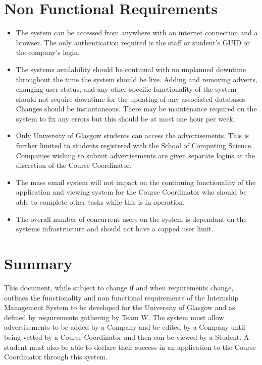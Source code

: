\documentclass{l3deliverable}
\begin{document}
\section{Non Functional Requirements}
\begin{itemize}
\item The system can be accessed from anywhere with an internet connection and a
browser. The only authentication required is the staff or student's GUID or 
the company's login.

\item The systems availability should be continual with no unplanned downtime
throughout the time the system should be live. Adding and removing adverts, changing user status,
and any other specific functionality of the system should not require downtime
for the updating of any associated databases. Changes should be instantaneous. There may be maintenance required on
the system to fix any errors but this should be at most one hour per week.

\item Only University of Glasgow students can access the advertisements. This is 
further limited to students registered with the School of Computing Science. 
Companies wishing to submit advertisements are given separate logins at the 
discretion of the Course Coordinator.

\item The mass email system will not impact on the continuing functionality of the 
application and viewing system for the Course Coordinator who should be able 
to complete other tasks while this is in operation.

\item The overall number of concurrent users on the system is dependant on the 
systems infrastructure and should not have a capped user limit.
\end{itemize}


\section{Summary}

This document, while subject to change if and when requirements change, outlines the functionality and non functional requirements of the Internship Management System to be developed for the University of Glasgow and as defined by requirements gathering by Team W. The system must allow advertisements to be added by a Company and be edited by a Company until being vetted by a Course Coordinator and then can be viewed by a Student. A student must also be able to declare their success in an application to the Course Coordinator through this system.
\end{document}
